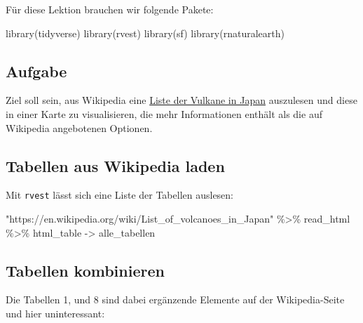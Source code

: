 \documentclass[
  ngerman,
]{article}
\newenvironment{Shaded}{\begin{snugshade}}{\end{snugshade}}
\newcommand{\FunctionTok}[1]{\textcolor[rgb]{0.00,0.00,0.00}{#1}}
\newcommand{\NormalTok}[1]{#1}
\newcommand{\OtherTok}[1]{\textcolor[rgb]{0.56,0.35,0.01}{#1}}
\newcommand{\SpecialCharTok}[1]{\textcolor[rgb]{0.00,0.00,0.00}{#1}}
\newcommand{\StringTok}[1]{\textcolor[rgb]{0.31,0.60,0.02}{#1}}
\begin{document}
Für diese Lektion brauchen wir folgende Pakete:

\begin{Shaded}
\begin{Highlighting}[]
\FunctionTok{library}\NormalTok{(tidyverse)}
\FunctionTok{library}\NormalTok{(rvest)}
\FunctionTok{library}\NormalTok{(sf)}
\FunctionTok{library}\NormalTok{(rnaturalearth)}
\end{Highlighting}
\end{Shaded}

\hypertarget{aufgabe}{%
\subsection{Aufgabe}\label{aufgabe}}

Ziel soll sein, aus Wikipedia eine \href{https://en.wikipedia.org/wiki/List_of_volcanoes_in_Japan}{Liste der Vulkane in Japan} auszulesen und diese in einer Karte zu visualisieren, die mehr Informationen enthält als die auf Wikipedia angebotenen Optionen.

\hypertarget{tabellen-aus-wikipedia-laden}{%
\subsection{Tabellen aus Wikipedia laden}\label{tabellen-aus-wikipedia-laden}}

Mit \texttt{rvest} lässt sich eine Liste der Tabellen auslesen:

\begin{Shaded}
\begin{Highlighting}[]
\StringTok{"https://en.wikipedia.org/wiki/List\_of\_volcanoes\_in\_Japan"} \SpecialCharTok{\%\textgreater{}\%}
\NormalTok{  read\_html }\SpecialCharTok{\%\textgreater{}\%}
\NormalTok{  html\_table }\OtherTok{{-}\textgreater{}}\NormalTok{ alle\_tabellen}
\end{Highlighting}
\end{Shaded}

\hypertarget{tabellen-kombinieren}{%
\subsection{Tabellen kombinieren}\label{tabellen-kombinieren}}

Die Tabellen 1, und 8 sind dabei ergänzende Elemente auf der Wikipedia-Seite und hier uninteressant:
\end{document}
